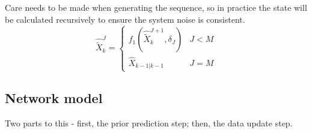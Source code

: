 Care needs to be made when generating the sequence,
so in practice the state will be calculated recursively to ensure
the system noise is consistent.
\begin{equation*}
\hat{\tilde X}_k^J =
\begin{cases}
    f_1(\hat{\tilde X}_k^{J+1}, \delta_J) & J < M \\
    \hat X_{k-1|k-1} & J = M
\end{cases}
\end{equation*}



\subsection{Network model}
\label{sec:kf}

Two parts to this - first, the prior prediction step; then, the data update step.
